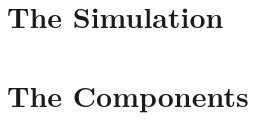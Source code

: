 \documentclass[a4paper]{book}
\begin{document}


\tableofcontents

\part{The Simulation}
\label{part:simulation}



\part{The Components}
\label{part:components}



\appendix{}




\printindex
\end{document}
